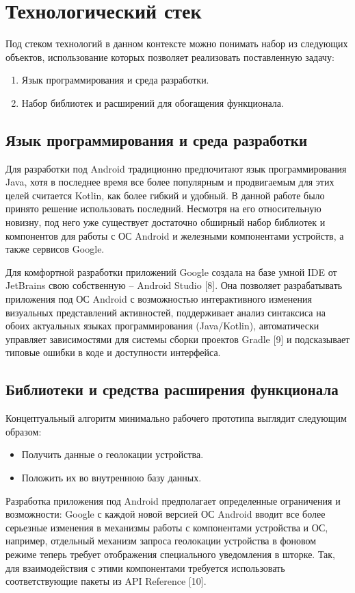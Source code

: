 \chapter{Технологический стек}
\label{chap:stack}
Под стеком технологий в данном контексте можно понимать набор из следующих объектов, использование которых позволяет реализовать поставленную задачу:
\begin{enumerate}
	\item Язык программирования и среда разработки.
	\item Набор библиотек и расширений для обогащения функционала.
\end{enumerate}

\section{Язык программирования и среда разработки}
Для разработки под Android традиционно предпочитают язык программирования Java, хотя в последнее время все более популярным и продвигаемым для этих целей считается Kotlin, как более гибкий и удобный. В данной работе было принято решение использовать последний.
Несмотря на его относительную новизну, под него уже существует достаточно обширный набор библиотек и компонентов для работы с ОС Android и железными компонентами устройств, а также сервисов Google.


Для комфортной разработки приложений Google создала на базе умной IDE от JetBrains свою собственную – Android Studio [8]. Она позволяет разрабатывать приложения под ОС Android с возможностью интерактивного изменения визуальных представлений активностей, поддерживает анализ синтаксиса на обоих актуальных языках программирования (Java/Kotlin), автоматически управляет зависимостями для системы сборки проектов Gradle [9] и подсказывает типовые ошибки в коде и доступности интерфейса.


\section{Библиотеки и средства расширения функционала}
Концептуальный алгоритм минимально рабочего прототипа выглядит следующим образом:
\begin{itemize}
	\item Получить данные о геолокации устройства.
	\item Положить их во внутреннюю базу данных.
\end{itemize}


Разработка приложения под Android предполагает определенные ограничения и возможности: Google с каждой новой версией ОС Android вводит все более серьезные изменения в механизмы работы с компонентами устройства и ОС, например, отдельный механизм запроса геолокации устройства в фоновом режиме теперь требует отображения специального уведомления в шторке.
Так, для взаимодействия с этими компонентами требуется использовать соответствующие пакеты из API Reference [10].


